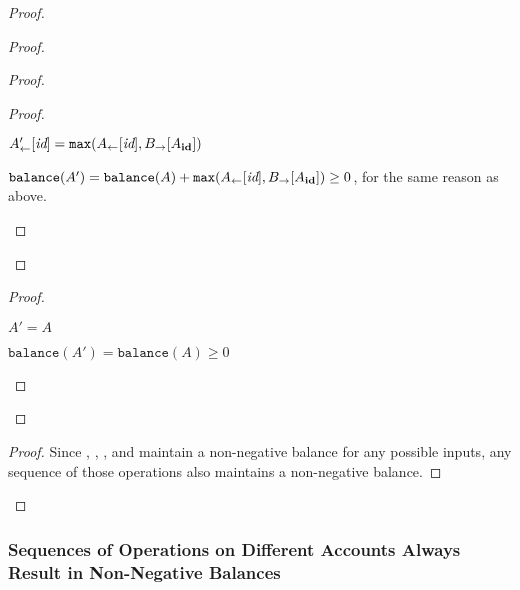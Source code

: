 \documentclass[9pt, oneside]{article}   	%
\begin{document}
\begin{proof}
\begin{proof}
\begin{proof}
			\begin{proof}
				\begin{pfenum}
					\item $A'_\leftarrow [\textit{id}] = \texttt{max}(A_\leftarrow [\textit{id}], B_{\rightarrow}[A_{\scriptsize\textbf{id}}])$
					\item $\texttt{balance}(A') = \texttt{balance}(A) +  \texttt{max}(A_\leftarrow [\textit{id}], B_{\rightarrow}[A_{\scriptsize\textbf{id}}]) \geq 0$, for the same reason as above.
				\end{pfenum}
			\end{proof}

			
		\end{proof}
		
		\begin{proof}
			\begin{pfenum}
				\item $A' = A$
				\item $\texttt{balance}(A') = \texttt{balance}(A) \geq 0$
			\end{pfenum}
		\end{proof}		
	\end{proof}

	\qedstep
	\begin{proof}
		Since , , , and  maintain a non-negative balance for any possible inputs, any sequence of those operations also maintains a non-negative balance.
	\end{proof}
\end{proof}

\subsubsection{Sequences of Operations on Different Accounts Always Result in Non-Negative Balances}
\end{document}
